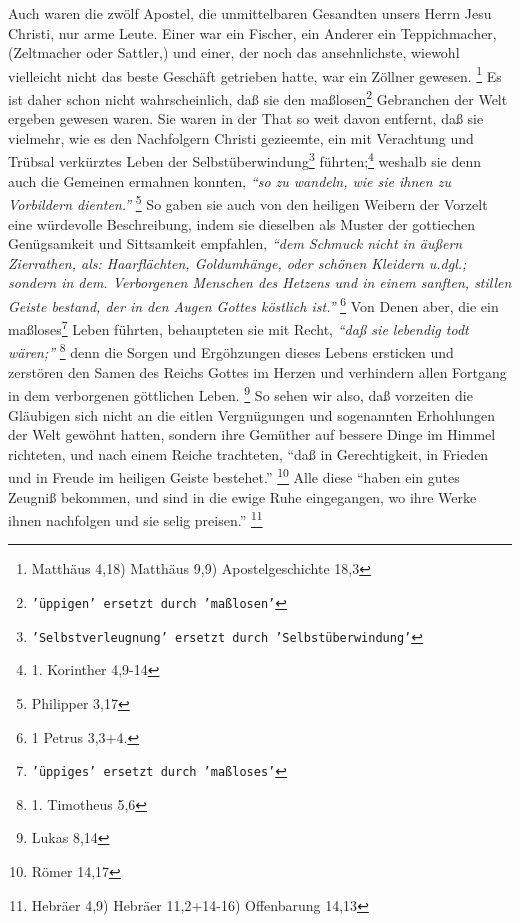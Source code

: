 Auch waren die zwölf Apostel, die unmittelbaren Gesandten unsers Herrn Jesu
Christi, nur arme Leute. Einer war ein Fischer, ein Anderer ein Teppichmacher,
(Zeltmacher oder Sattler,) und einer, der noch das ansehnlichste, wiewohl
vielleicht nicht das beste Geschäft getrieben hatte, war ein Zöllner
gewesen.
\footnote{Matthäus 4,18) Matthäus 9,9) Apostelgeschichte 18,3} 
Es ist daher
schon nicht wahrscheinlich, daß sie den maßlosen\footnote{\texttt{'üppigen' ersetzt durch 'maßlosen'}} Gebranchen der Welt ergeben
gewesen waren. Sie waren in der That so weit davon entfernt, daß sie vielmehr,
wie es den Nachfolgern Christi gezieemte, ein mit Verachtung und Trübsal
verkürztes Leben der Selbstüberwindung\footnote{\texttt{'Selbstverleugnung' ersetzt durch 'Selbstüberwindung'}} führten;\footnote{1. Korinther 4,9-14}
weshalb
sie denn auch die Gemeinen ermahnen konnten, 
\textit{"`so zu wandeln, wie sie ihnen zu
Vorbildern dienten."'}
\footnote{Philipper 3,17} 
So gaben sie auch von den heiligen
Weibern der Vorzelt eine würdevolle Beschreibung, indem sie dieselben als Muster
der gottiechen Genügsamkeit und Sittsamkeit empfahlen, 
\textit{"`dem Schmuck nicht in
äußern Zierrathen, als: Haarflächten, Goldumhänge, oder schönen Kleidern u.dgl.;
sondern in dem. Verborgenen Menschen des Hetzens und in einem sanften, stillen
Geiste bestand, der in den Augen Gottes köstlich ist."'}
\footnote{1 Petrus 3,3+4.} 
Von Denen aber, die ein maßloses\footnote{\texttt{'üppiges' ersetzt durch 'maßloses'}} Leben führten, behaupteten sie mit Recht,
\textit{"`daß sie lebendig todt wären;"'}
\footnote{1. Timotheus 5,6} 
denn die Sorgen und
Ergöhzungen dieses Lebens ersticken und zerstören den Samen des Reichs Gottes im
Herzen und verhindern allen Fortgang in dem verborgenen göttlichen
Leben.
\footnote{Lukas 8,14} 
So sehen wir also, daß vorzeiten die Gläubigen sich
nicht an die eitlen Vergnügungen und sogenannten Erhohlungen der Welt gewöhnt
hatten, sondern ihre Gemüther auf bessere Dinge im Himmel richteten, und nach
einem Reiche trachteten, 
"`daß in Gerechtigkeit, in Frieden und in Freude im
heiligen Geiste bestehet."'
\footnote{Römer 14,17} 
Alle diese 
"`haben ein gutes
Zeugniß bekommen, und sind in die ewige Ruhe eingegangen, wo ihre Werke ihnen
nachfolgen und sie selig preisen."'
\footnote{Hebräer 4,9) Hebräer 11,2+14-16)
Offenbarung 14,13}

